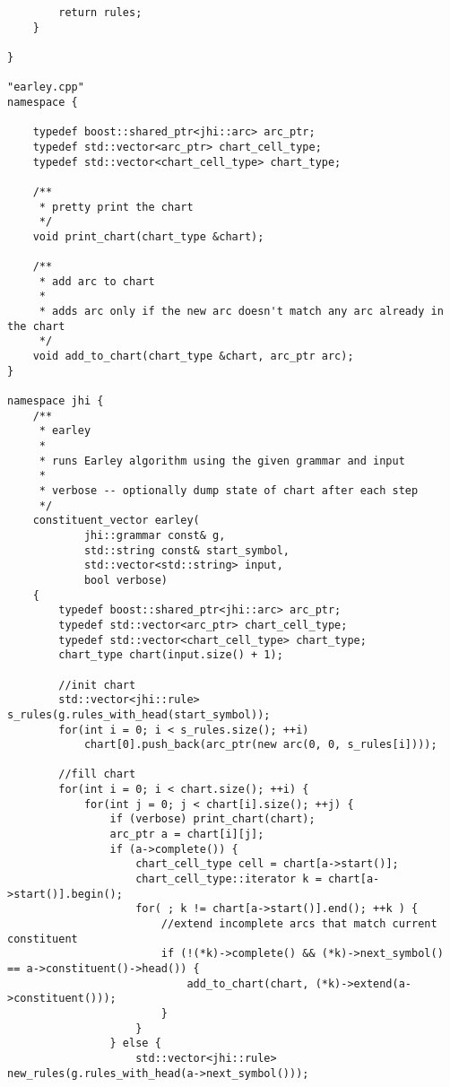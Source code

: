 \documentclass[11pt,a4paper]{jsarticle}
\begin{document}
{\begin{verbatim}
        return rules;
    }

}

"earley.cpp"
namespace {

    typedef boost::shared_ptr<jhi::arc> arc_ptr;
    typedef std::vector<arc_ptr> chart_cell_type;
    typedef std::vector<chart_cell_type> chart_type;

    /**
     * pretty print the chart
     */
    void print_chart(chart_type &chart);

    /**
     * add arc to chart
     *
     * adds arc only if the new arc doesn't match any arc already in the chart
     */
    void add_to_chart(chart_type &chart, arc_ptr arc);
}

namespace jhi {
    /**
     * earley
     *
     * runs Earley algorithm using the given grammar and input
     *
     * verbose -- optionally dump state of chart after each step
     */
    constituent_vector earley(
            jhi::grammar const& g,
            std::string const& start_symbol,
            std::vector<std::string> input,
            bool verbose)
    {
        typedef boost::shared_ptr<jhi::arc> arc_ptr;
        typedef std::vector<arc_ptr> chart_cell_type;
        typedef std::vector<chart_cell_type> chart_type;
        chart_type chart(input.size() + 1);

        //init chart
        std::vector<jhi::rule> s_rules(g.rules_with_head(start_symbol));
        for(int i = 0; i < s_rules.size(); ++i)
            chart[0].push_back(arc_ptr(new arc(0, 0, s_rules[i])));

        //fill chart
        for(int i = 0; i < chart.size(); ++i) {
            for(int j = 0; j < chart[i].size(); ++j) {
                if (verbose) print_chart(chart);
                arc_ptr a = chart[i][j];
                if (a->complete()) {
                    chart_cell_type cell = chart[a->start()];
                    chart_cell_type::iterator k = chart[a->start()].begin();
                    for( ; k != chart[a->start()].end(); ++k ) {
                        //extend incomplete arcs that match current constituent
                        if (!(*k)->complete() && (*k)->next_symbol() == a->constituent()->head()) {
                            add_to_chart(chart, (*k)->extend(a->constituent()));
                        }
                    }
                } else {
                    std::vector<jhi::rule> new_rules(g.rules_with_head(a->next_symbol()));


\end{verbatim}}
\end{document}
